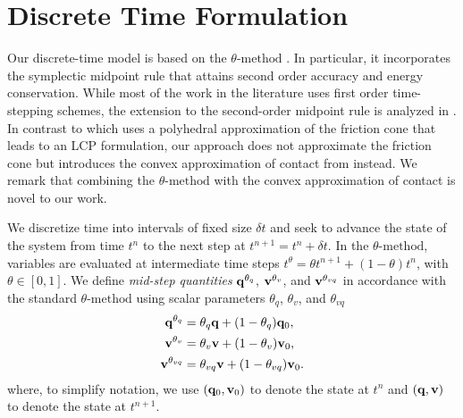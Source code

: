 \section{Discrete Time Formulation}
\label{sec:discrete_time_formulation}

Our discrete-time model is based on the $\theta\text{-method}$ \cite[\S
II.7]{bib:hairer2008solving}. In particular, it incorporates the symplectic
midpoint rule that attains second order accuracy and energy conservation. While
most of the work in the literature uses first order time-stepping schemes, the
extension to the second-order midpoint rule is analyzed in
\cite{bib:potra2006linearly}. In contrast to \cite{bib:potra2006linearly} which
uses a polyhedral approximation of the friction cone that leads to an LCP
formulation, our approach does not approximate the friction cone but introduces
the convex approximation of contact from \cite{bib:anitescu2006} instead. We
remark that combining the $\theta\text{-method}$ with the convex approximation
of contact is novel to our work. 

We discretize time into intervals of fixed size $\delta t$ and seek to advance the
state of the system from time $t^n$ to the next step at $t^{n+1} = t^n + \delta t$. In
the $\theta\text{-method}$, variables are evaluated at intermediate time steps
$t^\theta = \theta t^{n+1}+(1-\theta)t^{n}$, with $\theta \in [0, 1]$. We define
\emph{mid-step quantities} ${\mathbf{q}}^{\theta_{q}}$, ${\mathbf{v}}^{\theta_{v}}$, and
${\mathbf{v}}^{\theta_{vq}}$ in accordance with the standard $\theta\text{-method}$
using scalar parameters $\theta_q$, $\theta_v$, and $\theta_{vq}$
\begin{align}
	\mf{q}^{\theta_q} &= \theta_q\mf{q} + (1-\theta_{q})\mf{q}_0,\nonumber\\
	\mf{v}^{\theta_v} &= \theta_v\mf{v} + (1-\theta_v)\mf{v}_0,\nonumber\\
	\mf{v}^{\theta_{vq}} &= \theta_{vq}\mf{v} + (1-\theta_{vq})\mf{v}_0.
	\label{eq:theta_method}
\end{align}
where, to simplify notation, we use $({\mathbf{q}}_0, {\mathbf{v}}_0)$ to denote the state
at $t^n$ and $({\mathbf{q}}, {\mathbf{v}})$ to denote the state at $t^{n+1}$.

